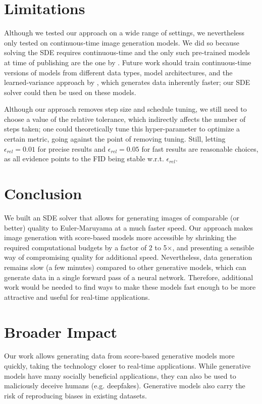 \documentclass{article}
\begin{document}
\section{Limitations}

Although we tested our approach on a wide range of settings, we nevertheless only tested on continuous-time image generation models. We did so because solving the SDE requires continuous-time and the only such pre-trained models at time of publishing are the one by \citet{song2020score}. 
Future work should train continuous-time versions of models from different data types, model architectures, and the learned-variance approach by \citet{nichol2021improved}, which generates data inherently faster; our SDE solver could then be used on these models.

Although our approach removes step size and schedule tuning, we still need to choose a value of the relative tolerance, which indirectly affects the number of steps taken; one could theoretically tune this hyper-parameter to optimize a certain metric, going against the point of removing tuning. Still, letting $\epsilon_{rel}=0.01$ for precise results and $\epsilon_{rel}=0.05$ for fast results are reasonable choices, as all evidence points to the FID being stable w.r.t. $\epsilon_{rel}$.

\section{Conclusion}

We built an SDE solver that allows for generating images of comparable (or better) quality to Euler-Maruyama at a much faster speed. Our approach makes image generation with score-based models more accessible by shrinking the required computational budgets by a factor of 2 to 5$\times$, and presenting a sensible way of compromising quality for additional speed. Nevertheless, data generation remains slow (a few minutes) compared to other generative models, which can generate data in a single forward pass of a neural network.
Therefore, additional work would be needed to find ways to make these models fast enough to be more attractive and useful for real-time applications.

\section{Broader Impact}
Our work allows generating data from score-based generative models more quickly, taking the technology closer to real-time applications.
While generative models have many socially beneficial applications, they can also be used to maliciously deceive humans (e.g. deepfakes). Generative models also carry the risk of reproducing biases in existing datasets.
\end{document}
